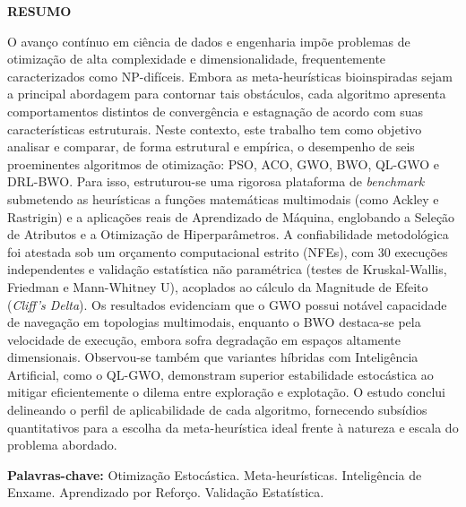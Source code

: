 \documentclass[12pt, a4paper, oneside]{report}
\begin{document}
\begin{center}
    \textbf{\Large RESUMO}
\end{center}
\vspace{1cm}
O avanço contínuo em ciência de dados e engenharia impõe problemas de otimização de alta complexidade e dimensionalidade, frequentemente caracterizados como NP-difíceis. Embora as meta-heurísticas bioinspiradas sejam a principal abordagem para contornar tais obstáculos, cada algoritmo apresenta comportamentos distintos de convergência e estagnação de acordo com suas características estruturais. Neste contexto, este trabalho tem como objetivo analisar e comparar, de forma estrutural e empírica, o desempenho de seis proeminentes algoritmos de otimização: PSO, ACO, GWO, BWO, QL-GWO e DRL-BWO. Para isso, estruturou-se uma rigorosa plataforma de \textit{benchmark} submetendo as heurísticas a funções matemáticas multimodais (como Ackley e Rastrigin) e a aplicações reais de Aprendizado de Máquina, englobando a Seleção de Atributos e a Otimização de Hiperparâmetros. A confiabilidade metodológica foi atestada sob um orçamento computacional estrito (NFEs), com 30 execuções independentes e validação estatística não paramétrica (testes de Kruskal-Wallis, Friedman e Mann-Whitney U), acoplados ao cálculo da Magnitude de Efeito (\textit{Cliff's Delta}). Os resultados evidenciam que o GWO possui notável capacidade de navegação em topologias multimodais, enquanto o BWO destaca-se pela velocidade de execução, embora sofra degradação em espaços altamente dimensionais. Observou-se também que variantes híbridas com Inteligência Artificial, como o QL-GWO, demonstram superior estabilidade estocástica ao mitigar eficientemente o dilema entre exploração e explotação. O estudo conclui delineando o perfil de aplicabilidade de cada algoritmo, fornecendo subsídios quantitativos para a escolha da meta-heurística ideal frente à natureza e escala do problema abordado.

\vspace{0.5cm}
\noindent \textbf{Palavras-chave:} Otimização Estocástica. Meta-heurísticas. Inteligência de Enxame. Aprendizado por Reforço. Validação Estatística.
\clearpage
\end{document}
